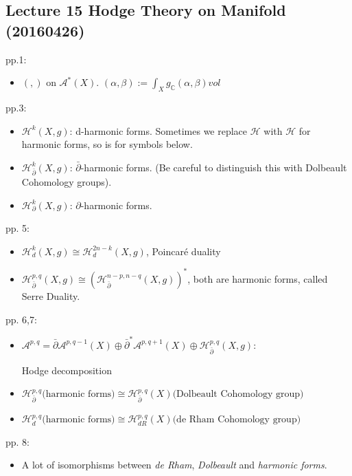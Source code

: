 \documentclass{article}
\numberwithin{equation}{subsection} %
\begin{document}
	\subsection{Lecture 15 Hodge Theory on Manifold (20160426)}
	pp.1:
	\begin{itemize}
		\item $(,)$ on $\mathcal{A}^*(X)$. $(\alpha,\beta):=\int_X g_\mathbb{C}(\alpha,\beta) vol$
	\end{itemize}
	pp.3:
	\begin{itemize}
		\item $\mathcal{H}^k(X,g)$: d-harmonic forms. Sometimes we replace $\mathcal{H}$ with $\mathscr{H}$ for harmonic forms, so is for symbols below.
		\item $\mathcal{H}^k_{\bar{\partial}}(X,g)$: $\bar{\partial}$-harmonic forms. 
		(Be careful to distinguish this with Dolbeault Cohomology groups).
		\item $\mathcal{H}^k_{\partial}(X,g)$: $\partial$-harmonic forms.
	\end{itemize}
	pp. 5:
	\begin{itemize}
		\item $\mathcal{H}^k_d(X,g) \cong \mathcal{H}^{2n-k}_d(X,g)$, Poincar\'{e} duality
		\item $\mathcal{H}^{p,q}_{\bar{\partial}}(X,g) \cong 
		\left( \mathcal{H}^{n-p,n-q}_{\bar{\partial}}(X,g)\right)^*$, both are harmonic forms, called Serre Duality. 
	\end{itemize}
	pp. 6,7:
	\begin{itemize}
		\item 
		$\mathcal{A}^{p,q} = 
		\bar{\partial}\mathcal{A}^{p,q-1}(X)\oplus
		\bar{\partial}^* \mathcal{A}^{p,q+1}(X) \oplus
		\mathcal{H}^{p,q}_{\bar{\partial}}(X,g)$:
		
		 Hodge decomposition
	
		\item $\mathcal{H}^{p,q}_{\bar{\partial}}
			\text{(harmonic forms)}
			\cong
			\mathcal{H}^{p,q}_{\bar{\partial}}(X)
			\text{(Dolbeault Cohomology group)}$
		\item $\mathcal{H}^{p,q}_{d}
			\text{(harmonic forms)}
			\cong
			\mathcal{H}^{p,q}_{dR}(X)
			\text{(de Rham Cohomology group)}$
	\end{itemize}
	pp. 8:
	\begin{itemize}
		\item A lot of isomorphisms between \textit{de Rham}, \textit{Dolbeault} and \textit{harmonic forms}.
	\end{itemize}
	
\end{document}
